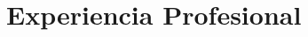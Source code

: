 
\section{Experiencia Profesional}
\vspace{3pt}

\resumeSubHeadingListStart








\resumeSubHeadingListEnd

\vspace{5pt}